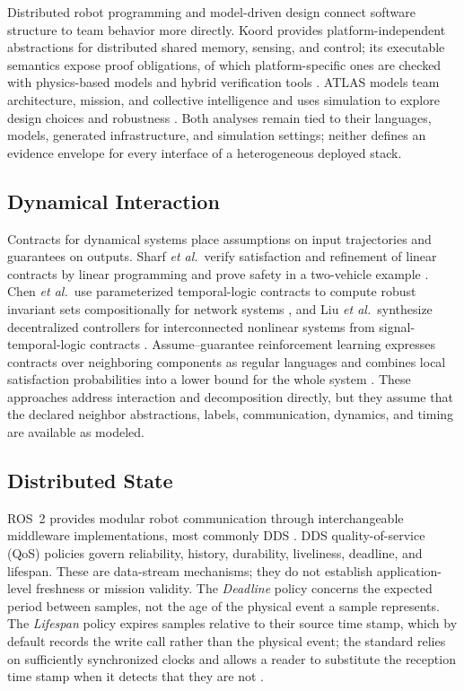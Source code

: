 Distributed robot programming and model-driven design connect software
structure to team behavior more directly.  Koord provides platform-independent
abstractions for distributed shared memory, sensing, and control; its executable
semantics expose proof obligations, of which platform-specific ones are checked
with physics-based models and hybrid verification tools \cite{ghosh2020koord}.
ATLAS models team architecture, mission, and collective intelligence and uses
simulation to explore design choices and robustness \cite{harbin2023design}.
Both analyses remain tied to their languages, models, generated infrastructure,
and simulation settings; neither defines an evidence envelope for every
interface of a heterogeneous deployed stack.

\subsection{Dynamical Interaction}

Contracts for dynamical systems place assumptions on input trajectories and
guarantees on outputs.  Sharf \emph{et al.}\ verify satisfaction and refinement
of linear contracts by linear programming and prove safety in a two-vehicle
example \cite{sharf2021dynamical}.  Chen \emph{et al.}\ use parameterized
temporal-logic contracts to compute robust invariant sets compositionally for
network systems \cite{chen2019invariance}, and Liu \emph{et al.}\ synthesize
decentralized controllers for interconnected nonlinear systems from
signal-temporal-logic contracts \cite{liu2022stlcontracts}.  Assume--guarantee
reinforcement learning expresses contracts over neighboring components as
regular languages and combines local satisfaction probabilities into a lower
bound for the whole system \cite{kazemi2024agrl}.  These approaches address
interaction and decomposition directly, but they assume that the declared
neighbor abstractions, labels, communication, dynamics, and timing are available
as modeled.

\subsection{Distributed State}

ROS~2 provides modular robot communication through interchangeable middleware
implementations, most commonly DDS \cite{macenski2022ros2,omg2015dds}.  DDS
quality-of-service (QoS) policies govern reliability,
history, durability, liveliness, deadline, and lifespan.  These are
data-stream mechanisms; they do not establish application-level freshness or
mission validity.  The \emph{Deadline} policy concerns the expected period
between samples, not the age of the physical event a sample represents.  The
\emph{Lifespan} policy expires samples relative to their source time stamp,
which by default records the write call rather than the physical event; the
standard relies on sufficiently synchronized clocks and allows a reader to
substitute the reception time stamp when it detects that they are not
\cite{omg2015dds}.

